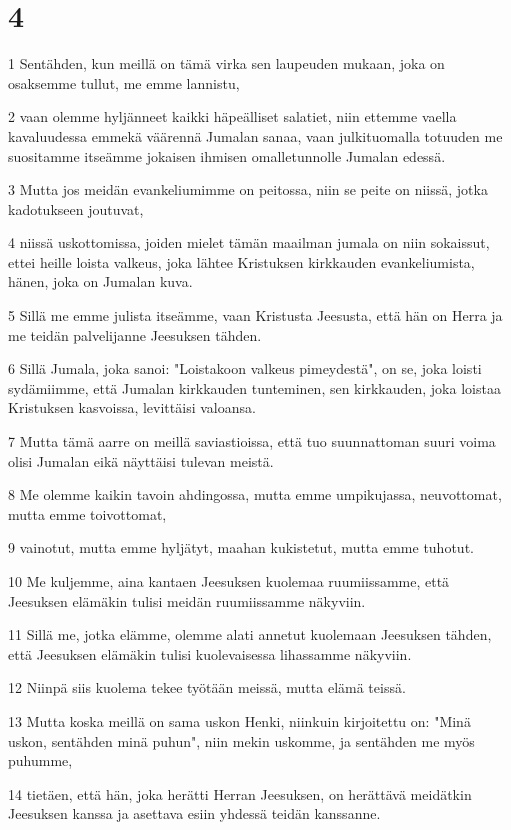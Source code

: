 \chapter{4}

\par 1 Sentähden, kun meillä on tämä virka sen laupeuden mukaan, joka on osaksemme tullut, me emme lannistu,
\par 2 vaan olemme hyljänneet kaikki häpeälliset salatiet, niin ettemme vaella kavaluudessa emmekä väärennä Jumalan sanaa, vaan julkituomalla totuuden me suositamme itseämme jokaisen ihmisen omalletunnolle Jumalan edessä.
\par 3 Mutta jos meidän evankeliumimme on peitossa, niin se peite on niissä, jotka kadotukseen joutuvat,
\par 4 niissä uskottomissa, joiden mielet tämän maailman jumala on niin sokaissut, ettei heille loista valkeus, joka lähtee Kristuksen kirkkauden evankeliumista, hänen, joka on Jumalan kuva.
\par 5 Sillä me emme julista itseämme, vaan Kristusta Jeesusta, että hän on Herra ja me teidän palvelijanne Jeesuksen tähden.
\par 6 Sillä Jumala, joka sanoi: "Loistakoon valkeus pimeydestä", on se, joka loisti sydämiimme, että Jumalan kirkkauden tunteminen, sen kirkkauden, joka loistaa Kristuksen kasvoissa, levittäisi valoansa.
\par 7 Mutta tämä aarre on meillä saviastioissa, että tuo suunnattoman suuri voima olisi Jumalan eikä näyttäisi tulevan meistä.
\par 8 Me olemme kaikin tavoin ahdingossa, mutta emme umpikujassa, neuvottomat, mutta emme toivottomat,
\par 9 vainotut, mutta emme hyljätyt, maahan kukistetut, mutta emme tuhotut.
\par 10 Me kuljemme, aina kantaen Jeesuksen kuolemaa ruumiissamme, että Jeesuksen elämäkin tulisi meidän ruumiissamme näkyviin.
\par 11 Sillä me, jotka elämme, olemme alati annetut kuolemaan Jeesuksen tähden, että Jeesuksen elämäkin tulisi kuolevaisessa lihassamme näkyviin.
\par 12 Niinpä siis kuolema tekee työtään meissä, mutta elämä teissä.
\par 13 Mutta koska meillä on sama uskon Henki, niinkuin kirjoitettu on: "Minä uskon, sentähden minä puhun", niin mekin uskomme, ja sentähden me myös puhumme,
\par 14 tietäen, että hän, joka herätti Herran Jeesuksen, on herättävä meidätkin Jeesuksen kanssa ja asettava esiin yhdessä teidän kanssanne.
